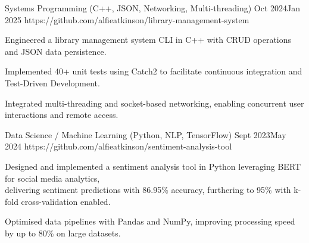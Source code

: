 {    
    {Systems Programming (C++, JSON, Networking, Multi-threading)}
    {Oct 2024}{Jan 2025}
    {https://github.com/alfieatkinson/library-management-system}
    {
        \item Engineered a library management system CLI in C++ with CRUD operations and JSON data persistence.\vspace{-0.5mm}
        \item Implemented 40+ unit tests using Catch2 to facilitate continuous integration and Test-Driven Development.\vspace{-0.5mm}
        \item Integrated multi-threading and socket-based networking, enabling concurrent user interactions and remote access.
    }

    {Data Science / Machine Learning (Python, NLP, TensorFlow)}
    {Sept 2023}{May 2024}
    {https://github.com/alfieatkinson/sentiment-analysis-tool}
    {
        \item Designed and implemented a sentiment analysis tool in Python leveraging BERT for social media analytics, \\delivering sentiment predictions with 86.95\% accuracy, furthering to 95\% with k-fold cross-validation enabled.\vspace{-0.5mm}
        \item Optimised data pipelines with Pandas and NumPy, improving processing speed by up to 80\% on large datasets.
    }
}

